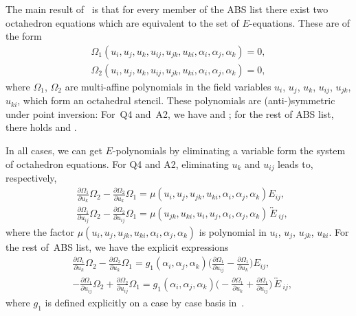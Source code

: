 \documentclass[pdftex]{sigma}
\newcommand{\inversion}[1]{\!\overleftrightarrow{\,#1\,}\!}
\newcommand{\pdv}[2]{\frac{\partial {#1}}{\partial {#2}}}
\numberwithin{equation}{section}
\begin{document}
The main result of~\cite{boll2016integrability} is that for every member of the ABS list there exist two octahedron equations which are equivalent to the set of $E$-equations. These are of the form
\begin{align*}
 \Omega_1(u_i,u_j,u_k,u_{ij}, u_{jk},u_{ki}, \alpha_i,\alpha_j,\alpha_k) = 0 , \\
 \Omega_2(u_i,u_j,u_k,u_{ij}, u_{jk},u_{ki},\alpha_i,\alpha_j,\alpha_k) = 0 ,
\end{align*}
where $\Omega_1$, $\Omega_2$ are multi-affine polynomials in the field variables $u_i$, $u_j$, $u_k$, $u_{ij}$, $u_{jk}$, $u_{ki}$, which form an octahedral stencil. These polynomials are (anti-)symmetric under point inversion:
For~Q4 and~A2, we have \smash{$\inversion \Omega_1 = \Omega_1$} and \smash{$\inversion \Omega_2 = \Omega_2$}; for the rest of ABS list, there holds \smash{$\inversion \Omega_1 = -\Omega_1$} and \smash{$\inversion \Omega_2 = \Omega_2$}.

In all cases, we can get $E$-polynomials by eliminating a variable form the system of octahedron equations. For Q4 and A2, eliminating $u_{k}$ and $u_{ij}$ leads to, respectively,
\begin{align}
 &\pdv{\Omega_1}{u_k} \Omega_2 - \pdv{\Omega_2}{u_k} \Omega_1 = \mu(u_i,u_j,u_{jk},u_{ki},\alpha_i,\alpha_j,\alpha_k) E_{ij} , \nonumber \\
 &\pdv{\Omega_1}{u_{ij}} \Omega_2 - \pdv{\Omega_2}{u_{ij}} \Omega_1 = \mu(u_{jk},u_{ki},u_i,u_j,\alpha_i,\alpha_j,\alpha_k) \inversion E_{ij} ,\label{Omegas-mu-E}
\end{align}
where the factor $\mu(u_i,u_j,u_{jk},u_{ki},\alpha_i,\alpha_j,\alpha_k)$ is polynomial in $u_i$, $u_j$, $u_{jk}$, $u_{ki}$.
For the rest of~ABS list, we have the explicit expressions
\begin{align}
 &\pdv{\Omega_1}{u_k} \Omega_2 - \pdv{\Omega_2}{u_k} \Omega_1 = g_1(\alpha_i,\alpha_j,\alpha_k) \biggl( \pdv{\Omega_1}{u_{ij}} - \pdv{\Omega_1}{u_k} \biggr) E_{ij} , \nonumber\\
 &-\pdv{\Omega_1}{u_{ij}} \Omega_2 + \pdv{\Omega_2}{u_{ij}} \Omega_1 = g_1(\alpha_i,\alpha_j,\alpha_k) \biggl( -\pdv{\Omega_1}{u_{k}} + \pdv{\Omega_1}{u_{ij}} \biggr) \inversion E_{ij} ,\label{Omegas-explicit-E}
\end{align}
where $g_1$ is defined explicitly on a case by case basis in~\cite[Proposition 5.3]{boll2016integrability}.
\end{document}
